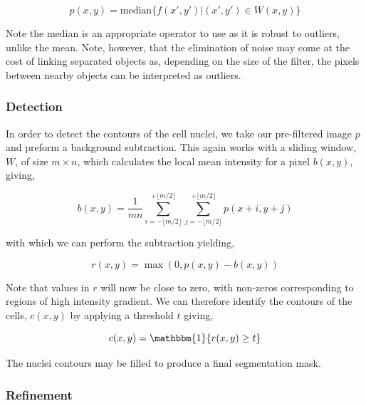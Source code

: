 \begin{equation}
p(x, y) = \text{median}\{f(x', y') | (x', y') \in W(x, y)\}
\end{equation}

Note the median is an appropriate operator to use as it is robust to outliers, unlike the mean. Note, however, that the elimination of noise may come at the cost of linking separated objects as, depending on the size of the filter, the pixels between nearby objects can be interpreted as outliers.

\subsubsection{Detection}

In order to detect the contours of the cell nuclei, we take our pre-filtered image $p$ and preform a background subtraction. This again works with a sliding window, $W$, of size $m\times n$, which calculates the local mean intensity for a pixel $b(x, y)$, giving,

\begin{equation}
b(x, y) = \frac{1}{mn}\sum_{i = -\lfloor m/2\rfloor}^{+\lfloor m/2\rfloor}\sum_{j= -\lfloor m/2\rfloor}^{+\lfloor m/2\rfloor} p(x +i, y + j)
\end{equation}

with which we can perform the subtraction yielding,

\begin{equation}
r(x, y) = \max(0, p(x, y) - b(x, y))
\end{equation}

Note that values in $r$ will now be close to zero, with non-zeros corresponding to regions of high intensity gradient. We can therefore identify the contours of the cells, $c(x, y)$ by applying a threshold $t$ giving,

\begin{equation}
c(x, y) = \mathbbm{1}\{r(x, y) \geq t\}
\end{equation}

The nuclei contours may be filled to produce a final segmentation mask.

\subsubsection{Refinement}

